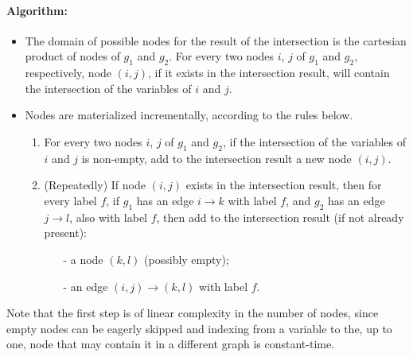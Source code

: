 \paragraph{Algorithm: }

\begin{itemize}
\item The domain of possible nodes for the result of the intersection
  is the cartesian product of nodes of $g_1$ and $g_2$. For every two
  nodes $i$, $j$ of $g_1$ and $g_2$, respectively, node $(i,j)$, if it
  exists in the intersection result, will contain the intersection of
  the variables of $i$ and $j$.
\item Nodes are materialized incrementally, according to
  the rules below.
  \begin{enumerate}
  \item For every two nodes $i$, $j$ of $g_1$ and $g_2$, if the intersection
  of the variables of $i$ and $j$ is non-empty, add to the intersection
  result a new node $(i,j)$.
  \item (Repeatedly) If node $(i,j)$ exists in the intersection result, then
    for every label $f$, if $g_1$ has an edge $i \rightarrow k$ with
    label $f$, and $g_2$ has an edge $j \rightarrow l$, also with label
    $f$, then add to the intersection result (if not already present):
    \begin{itemize}
    \item[-] a node $(k,l)$ (possibly empty);
    \item[-] an edge $(i,j) \rightarrow (k,l)$ with label $f$.
    \end{itemize}
  \end{enumerate}
\end{itemize}

Note that the first step is of linear complexity in the number of
nodes, since empty nodes can be eagerly skipped and indexing from a
variable to the, up to one, node that may contain it in a different
graph is constant-time.
  
